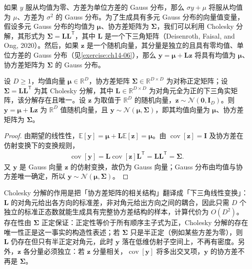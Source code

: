 \documentclass[../../main.tex]{subfiles}
\begin{document}
如果 $y$ 服从均值为零、方差为单位方差的 Gauss 分布，那么 $\sigma y+\mu$ 将服从均值为 $\mu$、方差为 $\sigma^{2}$ 的 Gauss 分布。为了生成具有多元 Gauss 分布的向量值变量，假设多元 Gauss 分布的均值为 $\bm{\mu}$、协方差矩阵为 $\bm{\Sigma}$，我们可以利用 Cholesky 分解，其形式为 $\bm{\Sigma}=\bm{L}\bm{L}^{\mathsf{T}}$，其中 $\bm{L}$ 是一个下三角矩阵（Deisenroth, Faisal, and Ong, 2020）。然后，如果 $\bm{z}$ 是一个随机向量，其分量是独立的且具有零均值、单位方差的 Gauss 分布（见\cref{exercise:ch14-06}），那么 $\bm{y}=\bm{\mu}+\bm{L}\bm{z}$ 将具有均值为 $\bm{\mu}$、协方差矩阵为 $\bm{\Sigma}$ 的 Gauss 分布。

\begin{proposition}\label{proposition:ch14-cholesky}
设 $D\geqslant1$，均值向量 $\bm{\mu}\in\mathbb{R}^{D}$，协方差矩阵 $\bm{\Sigma}\in\mathbb{R}^{D\times D}$ 为对称正定矩阵；设 $\bm{\Sigma}=\bm{L}\bm{L}^{\mathsf{T}}$ 为其 Cholesky 分解，其中 $\bm{L}\in\mathbb{R}^{D\times D}$ 为对角元全为正的下三角实矩阵，该分解存在且唯一。设 $\bm{z}$ 为取值于 $\mathbb{R}^{D}$ 的随机向量，$\bm{z}\sim\mathcal{N}(\bm{0},\bm{I}_{D})$。则 $\bm{y}=\bm{\mu}+\bm{L}\bm{z}$ 为 $\mathbb{R}^{D}$ 值随机向量，且 $\bm{y}\sim\mathcal{N}(\bm{\mu},\bm{\Sigma})$，即其均值向量为 $\bm{\mu}$、协方差矩阵为 $\bm{\Sigma}$。
\end{proposition}

\begin{proof}
由期望的线性性，$\mathbb{E}[\bm{y}]=\bm{\mu}+\bm{L}\mathbb{E}[\bm{z}]=\bm{\mu}$。由 $\operatorname{cov}[\bm{z}]=\bm{I}$ 及协方差在仿射变换下的变换规则，
\begin{align*}
\operatorname{cov}[\bm{y}]=\bm{L}\operatorname{cov}[\bm{z}]\bm{L}^{\mathsf{T}}=\bm{L}\bm{L}^{\mathsf{T}}=\bm{\Sigma}.
\end{align*}
又 $\bm{y}$ 是 Gauss 向量 $\bm{z}$ 的仿射变换，故仍为 Gauss 向量；Gauss 分布由均值与协方差唯一确定，所以 $\bm{y}\sim\mathcal{N}(\bm{\mu},\bm{\Sigma})$。
\end{proof}

\begin{remark}Cholesky 分解的作用是把「协方差矩阵的相关结构」翻译成「下三角线性变换」：$\bm{L}$ 的对角元给出各方向的标准差，非对角元给出方向之间的耦合，因此只需 $D$ 个独立的标准正态数就能生成具有完整协方差结构的样本，计算代价为 $O(D^{2})$。存在性由 $\bm{\Sigma}$ 正定保证：正定性等价于所有顺序主子式为正，Cholesky 分解的存在唯一性正是这一事实的构造性表述；若 $\bm{\Sigma}$ 只是半正定（例如某些方差为零），则 $\bm{L}$ 仍存在但只有半正定对角元，此时 $\bm{y}$ 落在低维仿射子空间上，不再有密度。另外，$\bm{z}$ 各分量必须独立：若 $\bm{z}$ 分量相关，$\operatorname{cov}[\bm{y}]$ 将多出交叉项，$\bm{y}$ 的协方差不再是 $\bm{\Sigma}$。
\end{remark}
\end{document}
